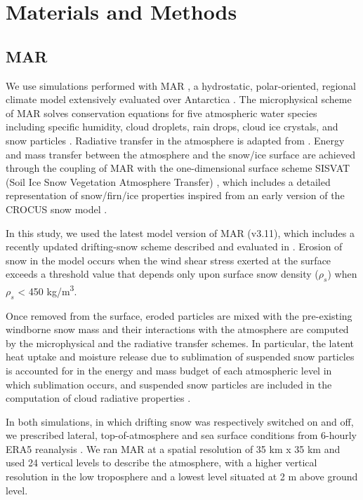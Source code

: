 \documentclass[draft]{agujournal2019}
\begin{document}
\section{Materials and Methods}

\subsection{MAR}
We use simulations performed with MAR \cite{Fettweis2013a, Hofer2020}, a hydrostatic, polar-oriented, regional climate model extensively evaluated over Antarctica \cite{Agosta2019, Mottram2020, Kittel2021} . The microphysical scheme of MAR solves conservation equations for five atmospheric water species including specific humidity, cloud droplets, rain drops, cloud ice crystals, and snow particles \cite{Gallee1994}. Radiative transfer in the atmosphere is adapted from . Energy and mass transfer between the atmosphere and the snow/ice surface are achieved through the coupling of MAR with the one-dimensional surface scheme SISVAT (Soil Ice Snow Vegetation Atmosphere Transfer) \cite{DeRidder1998, Gallee1997, Gallee2001}, which includes a detailed representation of snow/firn/ice properties inspired from an early version of the CROCUS snow model \cite{Brun1992}.

In this study, we used the latest model version of MAR (v3.11), which includes a recently updated drifting-snow scheme described and evaluated in . Erosion of snow in the model occurs when the wind shear stress exerted at the surface exceeds a threshold value that depends only upon surface snow density ($\rho_{s}$) when $\rho_{s}$ < 450 kg/m\textsuperscript{3}.

Once removed from the surface, eroded particles are mixed with the pre-existing windborne snow mass and their interactions with the atmosphere are computed by the microphysical and the radiative transfer schemes. In particular, the latent heat uptake and moisture release due to sublimation of suspended snow particles is accounted for in the energy and mass budget of each atmospheric level in which sublimation occurs, and suspended snow particles are included in the computation of cloud radiative properties \cite{Gallee2010}. 

In both simulations, in which drifting snow was respectively switched on and off, we prescribed lateral, top-of-atmosphere and sea surface conditions from 6-hourly ERA5 reanalysis \cite{Hersbach2020}. We ran MAR at a spatial resolution of 35 km x 35 km and used 24 vertical levels to describe the atmosphere, with a higher vertical resolution in the low troposphere and a lowest level situated at 2 m above ground level.
\end{document}
